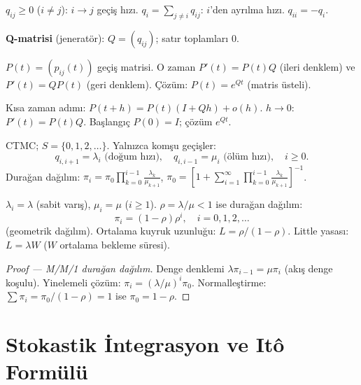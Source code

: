 \begin{tanim}\label{def:q_matrisi}
$q_{ij}\geq0$ ($i\neq j$): $i\to j$ geçiş hızı. $q_i=\sum_{j\neq i}q_{ij}$: $i$'den ayrılma hızı. $q_{ii}=-q_i$.

\textbf{Q-matrisi} (jeneratör): $Q=(q_{ij})$; satır toplamları $0$.
\end{tanim}

\begin{teorem}\label{thm:kolmogorov_ileri}
$P(t)=(p_{ij}(t))$ geçiş matrisi. O zaman $P'(t)=P(t)Q$ (ileri denklem) ve $P'(t)=QP(t)$ (geri denklem). Çözüm: $P(t)=e^{Qt}$ (matris üsteli).
\end{teorem}

\begin{ispatiskele}
Kısa zaman adımı: $P(t+h)=P(t)(I+Qh)+o(h)$. $h\to0$: $P'(t)=P(t)Q$. Başlangıç $P(0)=I$; çözüm $e^{Qt}$.
\end{ispatiskele}

\begin{tanim}\label{def:dogum_olum}
CTMC; $S=\{0,1,2,\ldots\}$. Yalnızca komşu geçişler:
\[
  q_{i,i+1}=\lambda_i \text{ (doğum hızı)}, \quad q_{i,i-1}=\mu_i \text{ (ölüm hızı)}, \quad i\geq0.
\]
Durağan dağılım: $\pi_i = \pi_0\prod_{k=0}^{i-1}\frac{\lambda_k}{\mu_{k+1}}$, $\pi_0 = \left[1+\sum_{i=1}^\infty\prod_{k=0}^{i-1}\frac{\lambda_k}{\mu_{k+1}}\right]^{-1}$.
\end{tanim}

\begin{ornek}[M/M/1 kuyruğu]\label{ex:mm1}
$\lambda_i=\lambda$ (sabit varış), $\mu_i=\mu$ ($i\geq1$). $\rho=\lambda/\mu<1$ ise durağan dağılım:
\[
  \pi_i = (1-\rho)\rho^i, \quad i=0,1,2,\ldots
\]
(geometrik dağılım). Ortalama kuyruk uzunluğu: $L=\rho/(1-\rho)$. Little yasası: $L=\lambda W$ ($W$ ortalama bekleme süresi).
\end{ornek}

\begin{proof}[Proof --- M/M/1 durağan dağılım]
Denge denklemi $\lambda\pi_{i-1}=\mu\pi_i$ (akış denge koşulu). Yinelemeli çözüm: $\pi_i=(\lambda/\mu)^i\pi_0$. Normalleştirme: $\sum\pi_i=\pi_0/(1-\rho)=1$ ise $\pi_0=1-\rho$.
\end{proof}

\section{Stokastik İntegrasyon ve Itô Formülü}
\label{sec:ito}


